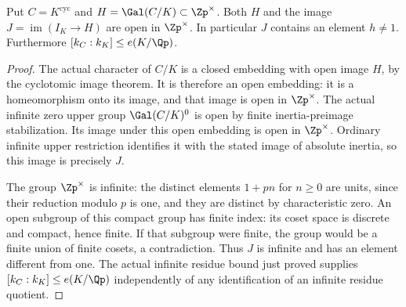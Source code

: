 \begin{lemma}
\label{ft:cyclotomic-inertia}
\leanok
Put $C=K^{\mathrm{cyc}}$ and
$H=\Gal(C/K)\subset\Zp^\times$. Both $H$ and the image
$J=\operatorname{im}(I_K\longrightarrow H)$ are open in
$\Zp^\times$. In particular $J$ contains an element $h\ne1$.
Furthermore $[k_C:k_K]\leq e(K/\Qp)$.
\end{lemma}
\begin{proof}
The actual character of $C/K$ is a closed embedding with open image
$H$, by the cyclotomic image theorem. It is therefore an open
embedding: it is a homeomorphism onto its image, and that image is
open in $\Zp^\times$.
The actual infinite zero upper group $\Gal(C/K)^0$ is open by
finite inertia-preimage stabilization. Its image under this open
embedding is open in $\Zp^\times$. Ordinary infinite upper
restriction identifies it with the stated image of absolute inertia,
so this image is precisely $J$.

The group $\Zp^\times$ is infinite: the distinct elements
$1+pn$ for $n\geq0$ are units, since their reduction modulo $p$
is one, and they are distinct by characteristic zero.
An open subgroup of this compact group has finite index: its
coset space is discrete and compact, hence finite. If that subgroup
were finite, the group would be a finite union of finite cosets,
a contradiction. Thus $J$ is infinite and has an element different
from one. The actual infinite residue bound just proved supplies
$[k_C:k_K]\leq e(K/\Qp)$ independently of any identification
of an infinite residue quotient.
\end{proof}


